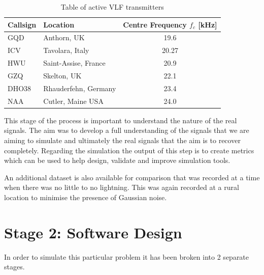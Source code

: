 \begin{table}[h!]
\centering
\begin{tabular}{l|l|c}
\textbf{Callsign} & \textbf{Location}    & \textbf{Centre Frequency $f_c$ [kHz]} \\
\hline 
GQD               & Anthorn, UK          & 19.6                            \\
ICV             & Tavolara, Italy & 20.27 \\
HWU               & Saint-Assise, France & 20.9                            \\
GZQ               & Skelton, UK          & 22.1                            \\
DHO38             & Rhauderfehn, Germany & 23.4                            \\
NAA               & Cutler, Maine USA    & 24.0                             
\end{tabular}
\caption{Table of active VLF transmitters}
\label{tab:vlftransmitters}
\end{table}

This stage of the process is important to understand the nature of the real signals. The aim was to develop a full understanding of the signals that we are aiming to simulate and ultimately the real signals that the aim is to recover completely. Regarding the simulation the output of this step is to create metrics which can be used to help design, validate and improve simulation tools.

An additional dataset is also available for comparison that was recorded at a time when there was no little to no lightning. This was again recorded at a rural location to minimise the presence of Gaussian noise.

\section{Stage 2: Software Design}
In order to simulate this particular problem it has been broken into 2 separate stages.
